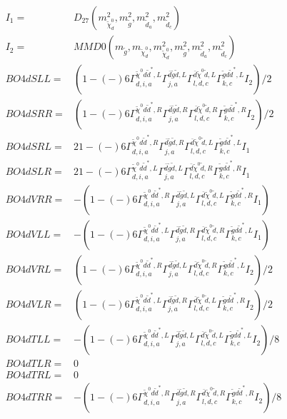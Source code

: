 \documentclass[A4,landscape]{article}
\begin{document}
\begin{align} 
I_1 = & D_{27}(m^2_{\tilde{\chi}^0_{{d}}}, m^2_{\tilde{g}}, m^2_{\tilde{d}_{{a}}}, m^2_{\tilde{d}_{{c}}}) \\ 
I_2 = & MMD0(m_{\tilde{g}}, m_{\tilde{\chi}^0_{{d}}}, m^2_{\tilde{\chi}^0_{{d}}}, m^2_{\tilde{g}}, m^2_{\tilde{d}_{{a}}}, m^2_{\tilde{d}_{{c}}}) \\ 
  BO4dSLL= & (  1
-(-)
  6 \Gamma^{\tilde{\chi}^0 d \tilde{d}^*,L}_{d, i, a} \Gamma^{\bar{d}\tilde{g} \tilde{d} ,L}_{j, a} \Gamma^{\bar{d}\tilde{\chi}^0 \tilde{d} ,L}_{l, d, c} \Gamma^{\tilde{g} d \tilde{d}^*,L}_{k, c} I_2)/2 \\ 
  BO4dSRR= & (  1
-(-)
  6 \Gamma^{\tilde{\chi}^0 d \tilde{d}^*,R}_{d, i, a} \Gamma^{\bar{d}\tilde{g} \tilde{d} ,R}_{j, a} \Gamma^{\bar{d}\tilde{\chi}^0 \tilde{d} ,R}_{l, d, c} \Gamma^{\tilde{g} d \tilde{d}^*,R}_{k, c} I_2)/2 \\ 
  BO4dSRL= & 2   1
-(-)
  6 \Gamma^{\tilde{\chi}^0 d \tilde{d}^*,R}_{d, i, a} \Gamma^{\bar{d}\tilde{g} \tilde{d} ,R}_{j, a} \Gamma^{\bar{d}\tilde{\chi}^0 \tilde{d} ,L}_{l, d, c} \Gamma^{\tilde{g} d \tilde{d}^*,L}_{k, c} I_1 \\ 
  BO4dSLR= & 2   1
-(-)
  6 \Gamma^{\tilde{\chi}^0 d \tilde{d}^*,L}_{d, i, a} \Gamma^{\bar{d}\tilde{g} \tilde{d} ,L}_{j, a} \Gamma^{\bar{d}\tilde{\chi}^0 \tilde{d} ,R}_{l, d, c} \Gamma^{\tilde{g} d \tilde{d}^*,R}_{k, c} I_1 \\ 
  BO4dVRR= & -(  1
-(-)
  6 \Gamma^{\tilde{\chi}^0 d \tilde{d}^*,R}_{d, i, a} \Gamma^{\bar{d}\tilde{g} \tilde{d} ,L}_{j, a} \Gamma^{\bar{d}\tilde{\chi}^0 \tilde{d} ,L}_{l, d, c} \Gamma^{\tilde{g} d \tilde{d}^*,R}_{k, c} I_1) \\ 
  BO4dVLL= & -(  1
-(-)
  6 \Gamma^{\tilde{\chi}^0 d \tilde{d}^*,L}_{d, i, a} \Gamma^{\bar{d}\tilde{g} \tilde{d} ,R}_{j, a} \Gamma^{\bar{d}\tilde{\chi}^0 \tilde{d} ,R}_{l, d, c} \Gamma^{\tilde{g} d \tilde{d}^*,L}_{k, c} I_1) \\ 
  BO4dVRL= & (  1
-(-)
  6 \Gamma^{\tilde{\chi}^0 d \tilde{d}^*,R}_{d, i, a} \Gamma^{\bar{d}\tilde{g} \tilde{d} ,L}_{j, a} \Gamma^{\bar{d}\tilde{\chi}^0 \tilde{d} ,R}_{l, d, c} \Gamma^{\tilde{g} d \tilde{d}^*,L}_{k, c} I_2)/2 \\ 
  BO4dVLR= & (  1
-(-)
  6 \Gamma^{\tilde{\chi}^0 d \tilde{d}^*,L}_{d, i, a} \Gamma^{\bar{d}\tilde{g} \tilde{d} ,R}_{j, a} \Gamma^{\bar{d}\tilde{\chi}^0 \tilde{d} ,L}_{l, d, c} \Gamma^{\tilde{g} d \tilde{d}^*,R}_{k, c} I_2)/2 \\ 
  BO4dTLL= & -(  1
-(-)
  6 \Gamma^{\tilde{\chi}^0 d \tilde{d}^*,L}_{d, i, a} \Gamma^{\bar{d}\tilde{g} \tilde{d} ,L}_{j, a} \Gamma^{\bar{d}\tilde{\chi}^0 \tilde{d} ,L}_{l, d, c} \Gamma^{\tilde{g} d \tilde{d}^*,L}_{k, c} I_2)/8 \\ 
  BO4dTLR= & 0 \\ 
  BO4dTRL= & 0 \\ 
  BO4dTRR= & -(  1
-(-)
  6 \Gamma^{\tilde{\chi}^0 d \tilde{d}^*,R}_{d, i, a} \Gamma^{\bar{d}\tilde{g} \tilde{d} ,R}_{j, a} \Gamma^{\bar{d}\tilde{\chi}^0 \tilde{d} ,R}_{l, d, c} \Gamma^{\tilde{g} d \tilde{d}^*,R}_{k, c} I_2)/8 \\ 
\end{align} 
\end{document}
